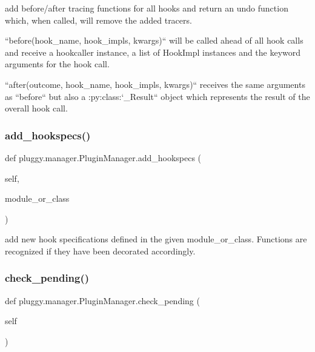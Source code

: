 \begin{DoxyVerb}add before/after tracing functions for all hooks
and return an undo function which, when called,
will remove the added tracers.

``before(hook_name, hook_impls, kwargs)`` will be called ahead
of all hook calls and receive a hookcaller instance, a list
of HookImpl instances and the keyword arguments for the hook call.

``after(outcome, hook_name, hook_impls, kwargs)`` receives the
same arguments as ``before`` but also a :py:class:`_Result`` object
which represents the result of the overall hook call.
\end{DoxyVerb}
 \mbox{\label{classpluggy_1_1manager_1_1_plugin_manager_a4dff3345289a96e3ca7e05f06bcda18e}} 
\subsubsection{\texorpdfstring{add\+\_\+hookspecs()}{add\_hookspecs()}}
{\footnotesize\ttfamily def pluggy.\+manager.\+Plugin\+Manager.\+add\+\_\+hookspecs (\begin{DoxyParamCaption}\item[{}]{self,  }\item[{}]{module\+\_\+or\+\_\+class }\end{DoxyParamCaption})}

\begin{DoxyVerb}add new hook specifications defined in the given module_or_class.
Functions are recognized if they have been decorated accordingly. \end{DoxyVerb}
 \mbox{\label{classpluggy_1_1manager_1_1_plugin_manager_a7d8054b9744509c85316f3d3611f35c4}} 
\subsubsection{\texorpdfstring{check\+\_\+pending()}{check\_pending()}}
{\footnotesize\ttfamily def pluggy.\+manager.\+Plugin\+Manager.\+check\+\_\+pending (\begin{DoxyParamCaption}\item[{}]{self }\end{DoxyParamCaption})}

